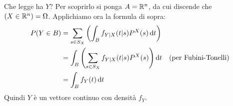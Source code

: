 Che legge ha $Y$? Per scoprirlo si ponga $A = \mathbb R^n$, da cui discende che $(X \in \mathbb R^n) = \Omega$. Applichiamo ora la formula di sopra:
\begin{align*}
	P(Y \in B) &= \sum\limits_{s \in S_X} \left( \int_{B} f_{Y|X} (t|s) P^X (s) \, \mathrm d t \right) &\\
	&= \int_{B} \left( \sum\limits_{s \in S_X} f_{Y|X} (t|s) P^X (s) \right) \mathrm d t &\text{(per Fubini-Tonelli)}\\
	&= \int_{B} f_Y(t) \, \mathrm d t &
\end{align*}
Quindi $Y$ è un vettore continuo con densità $f_Y$.

\cleardoublepage
